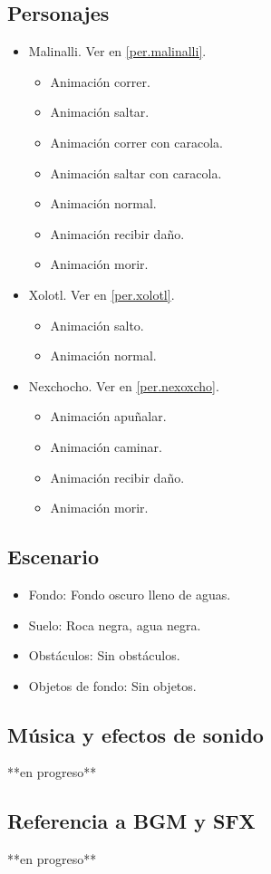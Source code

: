 	\subsection{Personajes}
	\begin{itemize}
		\item Malinalli. Ver en \ref{per.malinalli}.
		\begin{itemize}
			\item Animación correr.
			\item Animación saltar.
			\item Animación correr con caracola.
			\item Animación saltar con caracola.
			\item Animación normal.
			\item Animación recibir daño.
			\item Animación morir.
		\end{itemize}
		\item Xolotl. Ver en \ref{per.xolotl}.
		\begin{itemize}
				\item Animación salto.
				\item Animación normal.
		\end{itemize}
		\item Nexchocho. Ver en \ref{per.nexoxcho}.
		\begin{itemize}
			\item Animación apuñalar.
			\item Animación caminar.
			\item Animación recibir daño.
			\item Animación morir.
		\end{itemize}
	\end{itemize}
	\subsection{Escenario}
\begin{itemize} 
	\item Fondo: Fondo oscuro lleno de aguas.
	\item Suelo: Roca negra, agua negra.
	\item Obstáculos: Sin obstáculos.
	\item Objetos de fondo: Sin objetos.
\end{itemize}	
	\subsection{Música y efectos de sonido}
	**en progreso**
	\subsection{Referencia a BGM y SFX}
	**en progreso**